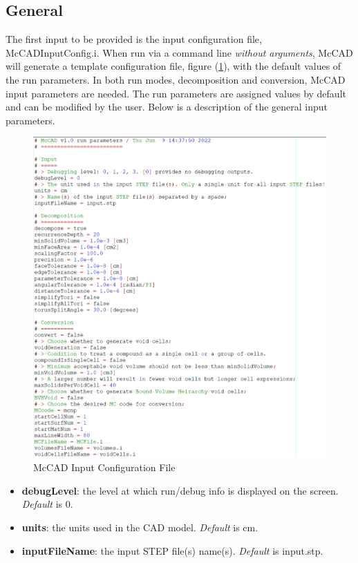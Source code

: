 \documentclass[12pt, a4paper, titlepage]{article}
\begin{document}
  \subsection{General}
	The first input to be provided is the input configuration file, McCADInputConfig.i.  When run via a command line \emph{without arguments}, McCAD will generate a template configuration file, figure (\ref{fig:config}), with the default values of the run parameters. In both run modes, decomposition and conversion, McCAD input parameters are needed. The run parameters are assigned values by default and can be modified by the user. Below is a description of the general input parameters.
	\begin{figure}[h!]
		\centering
		\includegraphics[scale=0.5]{figures/configFile.png}
		\caption{McCAD Input Configuration File}
		\label{fig:config}
	\end{figure}
	\begin{itemize}
		\item \textbf{debugLevel}: the level at which run/debug info is displayed on the screen. \emph{Default} is 0.
		\item \textbf{units}: the units used in the CAD model. \emph{Default} is cm.
		\item \textbf{inputFileName}: the input STEP file(s) name(s). \emph{Default} is input.stp.
	\end{itemize}
\end{document}
